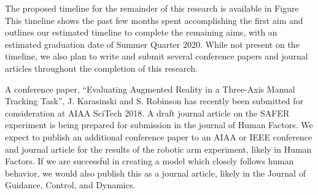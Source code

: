 The proposed timeline for the remainder of this research is available in Figure%
This timeline shows the past few months spent accomplishing the first aim and outlines our estimated timeline to complete the remaining aims, with an estimated graduation date of Summer Quarter 2020.
While not present on the timeline, we also plan to write and submit several conference papers and journal articles throughout the completion of this research.

A conference paper, ``Evaluating Augmented Reality in a Three-Axis Manual Tracking Task'', J. Karasinski and S. Robinson has recently been submitted for consideration at AIAA SciTech 2018.
A draft journal article on the SAFER experiment is being prepared for submission in the journal of Human Factors.
We expect to publish an additional conference paper to an AIAA or IEEE conference and journal article for the results of the robotic arm experiment, likely in Human Factors.
If we are successful in creating a model which closely follows human behavior, we would also publish this as a journal article, likely in the Journal of Guidance, Control, and Dynamics.

